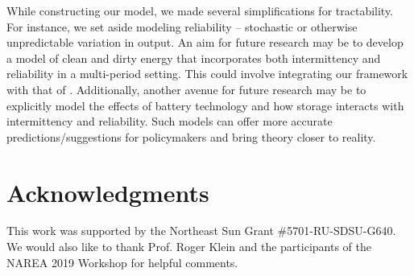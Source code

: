 \documentclass[11pt,a4paper,leqno]{extarticle}
\begin{document}
	While constructing our model, we made several simplifications for tractability. For instance, we set aside modeling reliability -- stochastic or otherwise unpredictable variation in output. An aim for future research may be to develop a model of clean and dirty energy that incorporates both intermittency and reliability in a multi-period setting. This could involve integrating our framework with that of \citet{HH}. Additionally, another avenue for future research may be to explicitly model the effects of battery technology and how storage interacts with intermittency and reliability. Such models can offer more accurate predictions/suggestions for policymakers and bring theory closer to reality.
	
	\section{Acknowledgments}
	
	This work was supported by the Northeast Sun Grant \#5701-RU-SDSU-G640. We would also like to thank Prof. Roger Klein and the participants of the NAREA 2019 Workshop for helpful comments.\\\\
	
\end{document}
